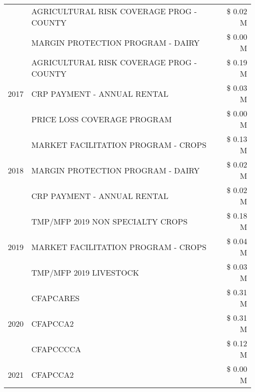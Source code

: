 \begin{tabular}{llr}
 & AGRICULTURAL RISK COVERAGE PROG - COUNTY      & \$ 0.02 M \\
 & MARGIN PROTECTION PROGRAM - DAIRY             & \$ 0.00 M \\
\cline{1-3}
\multirow[t]{3}{*}{2017} & AGRICULTURAL RISK COVERAGE PROG - COUNTY & \$ 0.19 M \\
 & CRP PAYMENT - ANNUAL RENTAL & \$ 0.03 M \\
 & PRICE LOSS COVERAGE PROGRAM & \$ 0.00 M \\
\cline{1-3}
\multirow[t]{3}{*}{2018} & MARKET FACILITATION PROGRAM - CROPS & \$ 0.13 M \\
 & MARGIN PROTECTION PROGRAM - DAIRY & \$ 0.02 M \\
 & CRP PAYMENT - ANNUAL RENTAL & \$ 0.02 M \\
\cline{1-3}
\multirow[t]{3}{*}{2019} & TMP/MFP 2019 NON SPECIALTY CROPS & \$ 0.18 M \\
 & MARKET FACILITATION PROGRAM - CROPS & \$ 0.04 M \\
 & TMP/MFP 2019 LIVESTOCK & \$ 0.03 M \\
\cline{1-3}
\multirow[t]{3}{*}{2020} & CFAPCARES & \$ 0.31 M \\
 & CFAPCCA2 & \$ 0.31 M \\
 & CFAPCCCCA & \$ 0.12 M \\
\cline{1-3}
2021 & CFAPCCA2 & \$ 0.00 M \\
\cline{1-3}
\bottomrule
\end{tabular}
